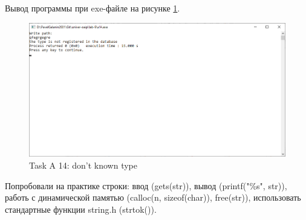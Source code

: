 \documentclass[12pt,a4paper]{article}
\begin{document}
Вывод программы при exe-файле на рисунке \ref{fig:a14-none}.

\begin{figure}[ht]
  \centering
  \includegraphics[width=12cm]{imgs/a14none.png}
  \caption{Task A 14: don't known type}
  \label{fig:a14-none}
\end{figure}

\begin{labconclusion}
Попробовали на практике строки: ввод (gets(str)), вывод (printf("\%s", str)), работь с динамической памятью (calloc(n, sizeof(char)), free(str)), использовать стандартные функции string.h (strtok()).
\end{labconclusion}
\end{document}
